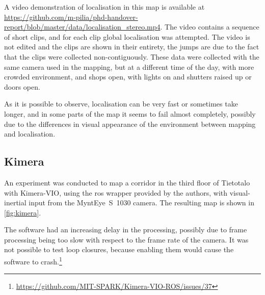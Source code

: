 \documentclass[11pt, letterpaper, twoside]{article}
\begin{document}
A video demonstration of localisation in this map is available at
\url{https://github.com/m-pilia/phd-handover-report/blob/master/data/localisation_stereo.mp4}.
The video contains a sequence of short clips, and for each clip global
localisation was attempted. The video is not edited and the clips are shown in
their entirety, the jumps are due to the fact that the clips were collected
non-contiguously. These data were collected with the same camera used in the
mapping, but at a different time of the day, with more crowded environment, and
shops open, with lights on and shutters raised up or doors open.

As it is possible to observe, localisation can be very fast or sometimes take
longer, and in some parts of the map it seems to fail almost completely,
possibly due to the differences in visual appearance of the environment between
mapping and localisation.

\subsection{Kimera}

An experiment was conducted to map a corridor in the third floor of Tietotalo
with Kimera-VIO, using the \gls{ros} wrapper provided by the authors, with
visual-inertial input from the MyntEye~S~1030 camera. The resulting map is
shown in \cref{fig:kimera}.

The software had an increasing delay in the processing, possibly due to frame
processing being too slow with respect to the frame rate of the camera. It was
not possible to test loop closures, because enabling them would cause the
software to
crash.\footnote{\url{https://github.com/MIT-SPARK/Kimera-VIO-ROS/issues/37}}
\end{document}
